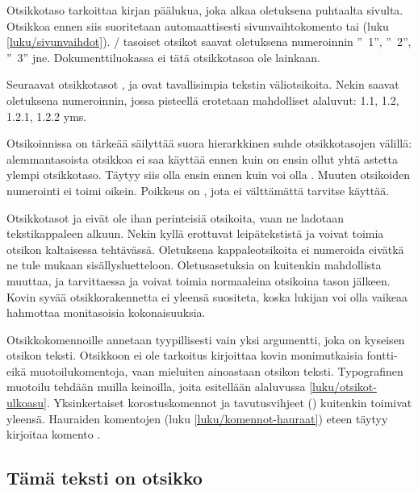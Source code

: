 Otsikkotaso  tarkoittaa kirjan päälukua, joka alkaa
oletuksena puhtaalta sivulta. Otsikkoa ennen siis suoritetaan
automaattisesti sivunvaihtokomento  tai
 (luku \ref{luku/sivunvaihdot}).
\-/ tasoiset otsikot saavat oletuksena numeroinnin
''\chaptername~1'', ''\chaptername~2'', ''\chaptername~3'' jne.
Dokumenttiluokassa  ei tätä otsikkotasoa ole lainkaan.

Seuraavat otsikkotasot ,  ja
 ovat tavallisimpia tekstin väliotsikoita. Nekin
saavat oletuksena numeroinnin, jossa pisteellä erotetaan mahdolliset
alaluvut: 1.1, 1.2, 1.2.1, 1.2.2 yms.

Otsikoinnissa on tärkeää säilyttää suora hierarkkinen suhde
otsikkotasojen välillä: alemmantasoista otsikkoa ei saa käyttää ennen
kuin on ensin ollut yhtä astetta ylempi otsikkotaso. Täytyy siis olla
ensin  ennen kuin voi olla . Muuten
otsikoiden numerointi ei toimi oikein. Poikkeus on , jota
ei välttämättä tarvitse käyttää.

Otsikkotasot  ja  eivät ole
ihan perinteisiä otsikoita, vaan ne ladotaan tekstikappaleen alkuun.
Nekin kyllä erottuvat leipätekstistä ja voivat toimia otsikon
kaltaisessa tehtävässä. Oletuksena kappaleotsikoita ei numeroida eivätkä
ne tule mukaan sisällysluetteloon. Oletusasetuksia on kuitenkin
mahdollista muuttaa, ja tarvittaessa  ja
 voivat toimia normaaleina otsikoina tason
 jälkeen. Kovin syvää otsikkorakennetta ei
yleensä suositeta, koska lukijan voi olla vaikeaa hahmottaa monitasoisia
kokonaisuuksia.

Otsikkokomennoille annetaan tyypillisesti vain yksi argumentti, joka on
kyseisen otsikon teksti. Otsikkoon ei ole tarkoitus kirjoittaa kovin
monimutkaisia fontti- eikä muotoilukomentoja, vaan mieluiten ainoastaan
otsikon teksti. Typografinen muotoilu tehdään muilla keinoilla, joita
esitellään alaluvussa \ref{luku/otsikot-ulkoasu}. Yksinkertaiset
korostuskomennot ja tavutusvihjeet (\komento{-}) kuitenkin toimivat
yleensä. Hauraiden komentojen (luku \ref{luku/komennot-hauraat}) eteen
täytyy kirjoitaa komento .

\begin{koodilohkosis}
\section{Tämä teksti on otsikko}
\end{koodilohkosis}

